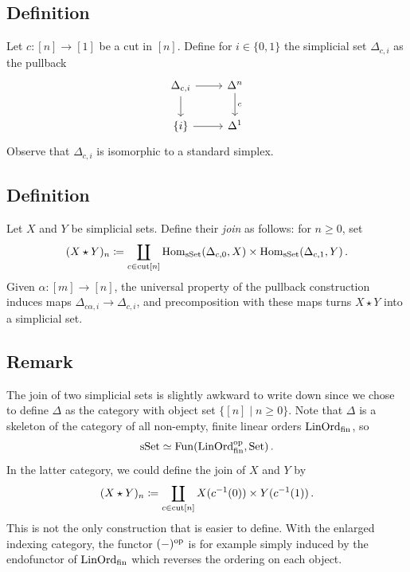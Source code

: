     \subsection{Definition}\label{chVI-3-3}
        Let $c \colon [n] \to [1]$ be a cut in $[n]$. Define for $i \in \{0, 1\}$ the simplicial set $\Delta_{c,i}$ as the pullback
        \begin{equation*}
            \begin{tikzcd}
                \Delta_{c,i} \arrow[d] \arrow[r] & \Delta^n \arrow[d, "c"] \\
                \{i\} \arrow[r] & \Delta^1
            \end{tikzcd}
        \end{equation*}
        Observe that $\Delta_{c,i}$ is isomorphic to a standard simplex.

    \subsection{Definition}\label{chVI-3-4}
        Let $X$ and $Y$ be simplicial sets. Define their \emph{join} as follows: for $n \geq 0$, set
        \begin{equation*}
            (X \star Y)_n \coloneq \coprod\limits_{c \in \operatorname{cut}[n]} \operatorname{Hom}_{\operatorname{sSet}}(\Delta_{c,0}, X) \times \operatorname{Hom}_{\operatorname{sSet}}(\Delta_{c,1}, Y) \,.
        \end{equation*}
        Given $\alpha \colon [m] \to [n]$, the universal property of the pullback construction induces maps $\Delta_{c \alpha, i} \to \Delta_{c,i}$, and precomposition with these maps turns $X \star Y$ into a simplicial set.

    \subsection{Remark}\label{chVI-3-5}
        The join of two simplicial sets is slightly awkward to write down since we chose to define $\Delta$ as the category with object set $\{[n] \mid n \geq 0 \}$. Note that $\Delta$ is a skeleton of the category of all non-empty, finite linear orders $\operatorname{LinOrd}_{\operatorname{fin}}$, so
        \begin{equation*}
            \operatorname{sSet} \simeq \operatorname{Fun}(\operatorname{LinOrd}^{\operatorname{op}}_{\operatorname{fin}}, \operatorname{Set}) \,.
        \end{equation*}
        In the latter category, we could define the join of $X$ and $Y$ by
        \begin{equation*}
            (X \star Y)_n \coloneq \coprod\limits_{c \in \operatorname{cut}[n]} X(c^{-1}(0)) \times Y(c^{-1}(1)) \,.
        \end{equation*}
        This is not the only construction that is easier to define. With the enlarged indexing category, the functor $(-)^{\operatorname{op}}$ is for example simply induced by the endofunctor of $\operatorname{LinOrd}_{\operatorname{fin}}$ which reverses the ordering on each object.

